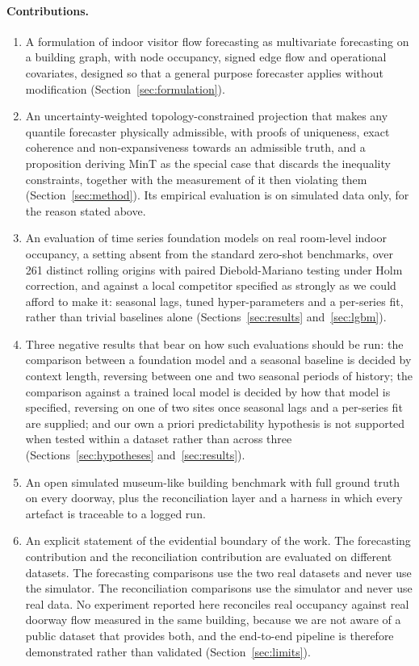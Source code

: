 \documentclass[utf8]{FrontiersinHarvard}
\newif\ifrevisionmarkup
\newcommand{\new}[1]{\ifrevisionmarkup\textcolor{revision}{#1}\else#1\fi}
\newif\ifsecondrevisionmarkup
\newcommand{\rev}[1]{\ifsecondrevisionmarkup\textcolor{revisiontwo}{#1}\else#1\fi}
\theoremstyle{plain}
\theoremstyle{definition}
\theoremstyle{remark}
\begin{document}
\paragraph{Contributions.}
\begin{enumerate}\itemsep2pt
\item A formulation of indoor visitor flow forecasting as multivariate forecasting on a building graph, with node occupancy, signed edge flow and operational covariates, designed so that a general purpose forecaster applies without modification (Section~\ref{sec:formulation}).
\item An uncertainty-weighted topology-constrained projection that makes any quantile forecaster physically admissible, with proofs of uniqueness, exact coherence and non-expansiveness towards an admissible truth, and a proposition deriving MinT as the special case that discards the inequality constraints, together with the measurement of it then violating them (Section~\ref{sec:method}). \new{Its empirical evaluation is on simulated data only, for the reason stated above.}
\item An evaluation of time series foundation models on \new{real} room-level indoor occupancy, a setting absent from the standard zero-shot benchmarks, over \num{261} distinct rolling origins with paired Diebold-Mariano testing under Holm correction, and against \new{a local competitor specified as strongly as we could afford to make it: seasonal lags, tuned hyper-parameters and a per-series fit, rather than trivial baselines alone (Sections~\ref{sec:results} and~\ref{sec:lgbm})}.
\item \new{Three} negative results that bear on how such evaluations should be run: the comparison between a foundation model and a seasonal baseline is decided by context length, reversing between one and two seasonal periods of history\new{; the comparison against a trained local model is decided by how that model is specified, reversing on one of two sites once seasonal lags and a per-series fit are supplied}; and our own \new{a priori} predictability hypothesis is \rev{not supported} when tested within a dataset rather than across three (Sections~\ref{sec:hypotheses} and~\ref{sec:results}).
\item An open simulated \new{museum-like building} benchmark with full ground truth on every doorway, plus the reconciliation layer and a harness in which every artefact is traceable to a logged run.
\item \new{An explicit statement of the evidential boundary of the work. The forecasting contribution and the reconciliation contribution are evaluated on different datasets. The forecasting comparisons use the two real datasets and never use the simulator. The reconciliation comparisons use the simulator and never use real data. No experiment reported here reconciles real occupancy against real doorway flow measured in the same building, because we are not aware of a public dataset that provides both, and the end-to-end pipeline is therefore demonstrated rather than validated (Section~\ref{sec:limits}).}
\end{enumerate}
\end{document}

